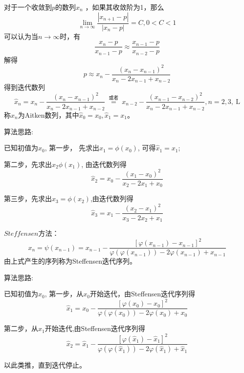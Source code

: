\documentclass[UTF8]{ctexart}
\begin{document}
对于一个收敛到$p$的数列${x_n}$ ，如果其收敛阶为1，那么
$$
\lim _{n \rightarrow \infty} \frac{\left|x_{n+1}-p\right|}{\left|x_{n}-p\right|}=C, 0<C<1
$$
可以认为当$n \rightarrow \infty$时，有
$$
\frac{x_{n}-p}{x_{n-1}-p} \approx \frac{x_{n-1}-p}{x_{n-2}-p}
$$
解得
$$
p \approx x_{n}-\frac{\left(x_{n}-x_{n-1}\right)^{2}}{x_{n}-2 x_{n-1}+x_{n-2}}
$$
得到迭代数列
$$
\hat{x}_{n}=x_{n}-\frac{\left(x_{n}-x_{n-1}\right)^{2}}{x_{n}-2 x_{n-1}+x_{n-2}} \stackrel{\text { 或者 }}{=} x_{n-2}-\frac{\left(x_{n-1}-x_{n-2}\right)^{2}}{x_{n}-2 x_{n-1}+x_{n-2}}, n=2,3, \mathrm{~L}
$$
称${x_n}$为Aitken数列，其中$\hat{x}_0=x_0, \hat{x}_1=x_1$。

\quad

算法思路:

已知初值为$x_0$, 第一步， 先求出$x_1=\phi(x_0)$, 可得$\hat{x}_1 = x_1$;

第二步，先求出$x_2\phi(x_1)$, 由迭代数列得
$$
\hat{x}_{2}=x_{0}-\frac{\left(x_{1}-x_{0}\right)^{2}}{x_{2}-2 x_{1}+x_{0}}
$$

第三步，先求出$x_3=\phi(x_2)$,由迭代数列得
$$
\hat{x}_{3}=x_{1}-\frac{\left(x_{2}-x_{1}\right)^{2}}{x_{3}-2 x_{2}+x_{1}}
$$

$Steffensen$方法：
$$
x_{n}=\psi\left(x_{n-1}\right)=x_{n-1}-\frac{\left[\varphi\left(x_{n-1}\right)-x_{n-1}\right]^{2}}{\varphi\left(\varphi\left(x_{n-1}\right)\right)-2 \varphi\left(x_{n-1}\right)+x_{n-1}}
$$
由上式产生的序列称为Steffensen迭代序列。

\quad

算法思路:

已知初值为$x_0$, 第一步，从$x_0$开始迭代，由Steffensen迭代序列得
$$
\hat{x}_{1}=x_{0}-\frac{\left[\varphi\left(x_{0}\right)-x_{0}\right]^{2}}{\varphi\left(\varphi\left(x_{0}\right)\right)-2 \varphi\left(x_{0}\right)+x_{0}}
$$

第二步，从$\hat{x}_1$开始迭代,由Steffensen迭代序列得
$$
\hat{x}_{2}=\hat{x}_{1}-\frac{\left[\varphi\left(\hat{x}_{1}\right)-\hat{x}_{1}\right]^{2}}{\varphi\left(\varphi\left(\hat{x}_{1}\right)\right)-2 \varphi\left(\hat{x}_{1}\right)+\hat{x}_{1}}
$$

以此类推，直到迭代停止。
\end{document}
